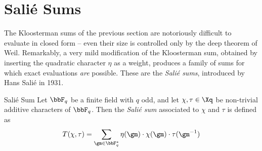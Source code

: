 \section{Sali\'{e} Sums}
The Kloosterman sums of the previous section are notoriously difficult to evaluate in closed form -- even their size is controlled only by the deep theorem of Weil. Remarkably, a very mild modification of the Kloosterman sum, obtained by inserting the quadratic character $\eta$ as a weight, produces a family of sums for which exact evaluations \emph{are} possible. These are the \emph{Sali\'{e} sums}, introduced by Hans Sali\'{e} in 1931.
\begin{Definition}{Sali\'{e} Sum}{}
  Let $\bbF_q$ be a finite field with $q$ odd, and let $\chi,\tau\in\Xq$ be non-trivial additive characters of $\bbF_q$. Then the \emph{Sali\'{e} sum} associated to $\chi$ and $\tau$ is defined as $$T(\chi,\tau)=\sum_{\gm\in\bbF_q^*}\eta(\gm)\cdot \chi(\gm)\cdot \tau(\gm^{-1})$$
\end{Definition}